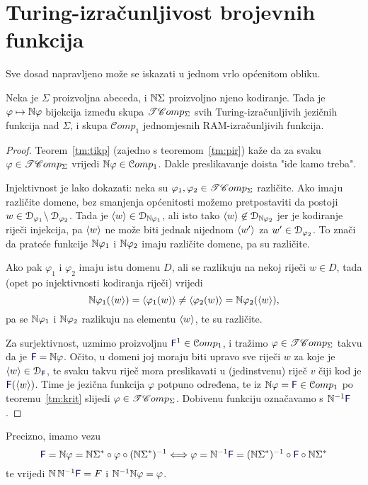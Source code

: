\section{Turing-izračunljivost brojevnih funkcija}

Sve dosad napravljeno može se iskazati u jednom vrlo općenitom obliku.

\begin{propozicija}\label{pp:trackbij}
Neka je $\Sigma$ proizvoljna abeceda, i ${\mathbb N}\Sigma$ proizvoljno njeno kodiranje. Tada je $\varphi\mapsto{\mathbb N}\varphi$ bijekcija između skupa $\mathscr{TC}omp_\Sigma$ svih Turing-izračunljivih jezičnih funkcija nad $\Sigma$, i skupa $\mathcal Comp_1$ jednomjesnih RAM-izračunljivih funkcija.
\end{propozicija}

\begin{proof}
Teorem~\ref{tm:tikp} (zajedno s teoremom~\ref{tm:pir}) kaže da za svaku $\varphi\in\mathscr{TC}omp_\Sigma$ vrijedi ${\mathbb N}\varphi\in\mathcal Comp_1$. Dakle preslikavanje doista "ide kamo treba".

Injektivnost je lako dokazati: neka su $\varphi_1,\varphi_2\in\mathscr{TC}omp_\Sigma$ različite. Ako imaju različite domene, bez smanjenja općenitosti možemo pretpostaviti da postoji $w\in\mathcal D_{\varphi_1}\!\setminus\mathcal D_{\varphi_2}$. Tada je $\langle w\rangle\in\mathcal D_{{\mathbb N}\varphi_1}$, ali isto tako $\langle w\rangle\not\in\mathcal D_{{\mathbb N}\varphi_2}$ jer je kodiranje riječi injekcija, pa $\langle w\rangle$ ne može biti jednak nijednom $\langle w'\rangle$ za $w'\in\mathcal D_{\varphi_2}$. To znači da prateće funkcije ${\mathbb N}\varphi_1$ i ${\mathbb N}\varphi_2$ imaju različite domene, pa su različite.

Ako pak $\varphi_1$ i $\varphi_2$ imaju istu domenu $D$, ali se razlikuju na nekoj riječi $w\in D$, tada (opet po injektivnosti kodiranja riječi) vrijedi
\begin{equation}
    {\mathbb N}\varphi_1(\langle w\rangle)=\langle\varphi_1(w)\rangle\not=\langle\varphi_2(w)\rangle={\mathbb N}\varphi_2(\langle w\rangle)\text,
\end{equation}
pa se ${\mathbb N}\varphi_1$ i ${\mathbb N}\varphi_2$ razlikuju na elementu $\langle w\rangle$, te su različite.

Za surjektivnost, uzmimo proizvoljnu $\f F^1\in\mathcal Comp_1$, i tražimo $\varphi\in\mathscr{TC}omp_\Sigma$ takvu da je $\f F=\N\varphi$. Očito, u domeni joj moraju biti upravo sve riječi $w$ za koje je $\kr w\in\dom{\f F}$, te svaku takvu riječ mora preslikavati u (jedinstvenu) riječ $v$ čiji kod je $\f F(\kr w)$. Time je jezična funkcija $\varphi$ potpuno određena, te iz $\N\varphi=\f F\in\mathcal Comp_1$ po teoremu~\ref{tm:krit} slijedi $\varphi\in\mathscr{TC}omp_\Sigma$. Dobivenu funkciju označavamo s $\N^{-1}\f F$.
\end{proof}
Precizno, imamo vezu
\begin{equation}
\f F=\N\varphi=\N\Sigma^*\circ\varphi\circ(\N\Sigma^*)^{-1}\Longleftrightarrow
\varphi=\N^{-1}\f F=(\N\Sigma^*)^{-1}\circ\f F\circ\N\Sigma^*
\end{equation}
te vrijedi $\N\,\N^{-1}\f F=F$ i ${\mathbb N}^{-1}{\mathbb N}\varphi=\varphi$.

